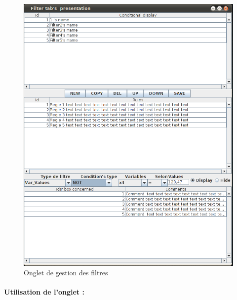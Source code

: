\documentclass[a4paper]{article}
\begin{document}
\begin{figure}[!h] %
  \center
  \includegraphics[scale=0.40]{spec-images/FilterTab.png} %
  \caption{Onglet de gestion des filtres} %
\end{figure} %

\paragraph{Utilisation de l'onglet :}
\end{document}
